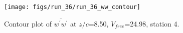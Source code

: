 \begin{figure}[H]
\centering
\texttt{[image: figs/run\_36/run\_36\_ww\_contour]}
\caption{Contour plot of $\overline{w^\prime w^\prime}$ at $z/c$=8.50, $V_{free}$=24.98, station 4.}
\label{fig:run_36_ww_contour}
\end{figure}


